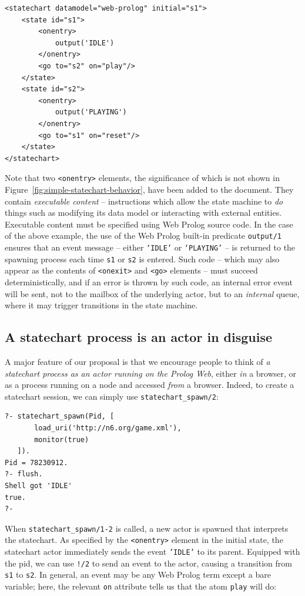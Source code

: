\begin{verbatim}
<statechart datamodel="web-prolog" initial="s1">
    <state id="s1">
        <onentry>
            output('IDLE')
        </onentry>
        <go to="s2" on="play"/>
    </state>
    <state id="s2">
        <onentry>
            output('PLAYING')
        </onentry>
        <go to="s1" on="reset"/>
    </state>
</statechart>
\end{verbatim}

\noindent Note that two \texttt{<onentry>} elements, the significance of which is not shown in Figure~\ref{fig:simple-statechart-behavior}, have been added to the document. They contain \textit{executable content} -- instructions which allow the state machine to \textit{do} things such as modifying its data model or interacting with external entities. Executable content must be specified using Web Prolog source code. In the case of the above example, the use of the Web Prolog built-in predicate \texttt{output/1} ensures that an event message -- either \texttt{`IDLE'} or \texttt{`PLAYING'} -- is returned to the spawning process each time \texttt{s1} or \texttt{s2} is entered. Such code -- which may also appear as the contents of \texttt{<onexit>} and \texttt{<go>} elements -- must succeed deterministically, and if an error is thrown by such code, an internal error event will be sent, not to the mailbox of the underlying actor, but to an \textit{internal} queue, where it may trigger transitions in the state machine.


\subsection{A statechart process is an actor in disguise}\label{sec:running-statechart-behavior}

A major feature of our proposal is that we encourage people to think of \textit{a statechart process as an actor running on the Prolog Web}, either \textit{in} a browser, or as a process running on a node and accessed \textit{from} a browser. Indeed, to create a statechart session, we can simply use \texttt{statechart\_spawn/2}:

\begin{verbatim}
?- statechart_spawn(Pid, [
       load_uri('http://n6.org/game.xml'),
       monitor(true)
   ]).
Pid = 78230912.
?- flush.
Shell got 'IDLE'
true.
?-
\end{verbatim}

\noindent When \texttt{statechart\_spawn/1-2} is called, a new actor is spawned that interprets the statechart. As specified by the \texttt{<onentry>} element in the initial state, the statechart actor immediately sends the event \texttt{'IDLE'} to its parent. Equipped with the pid, we can use \texttt{!/2} to send an event to the actor, causing a transition from \texttt{s1} to \texttt{s2}. In general, an event may be any Web Prolog term except a bare variable; here, the relevant \texttt{on} attribute tells us that the atom \texttt{play} will do:

